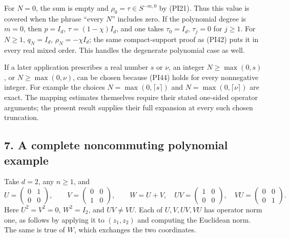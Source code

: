 \documentclass[
  11pt,
]{article}
\makeatletter
\let\ReaderOriginalAnchorStart\hyper@anchorstart
\let\ReaderOriginalAnchorEnd\hyper@anchorend
\let\ReaderPendingAliases\@empty
\def\ReaderArmAliases#1{\gdef\ReaderPendingAliases{#1}}
\def\hyper@anchorstart#1{\ReaderIfNativeAnchorTF{#1}{\ReaderPendingAliases\global\let\ReaderPendingAliases\@empty}{}\ReaderOriginalAnchorStart{#1}}
\makeatother
\begin{document}
For \(N=0\), the sum is empty and \(\rho_0=\tau\in S^{-m,0}\) by (PI21).
Thus this value is covered when the phrase ``every \(N\)'' includes
zero. If the polynomial degree is \(m=0\), then \(p=I_d\),
\(\tau=(1-\chi)I_d\), and one takes \(\tau_0=I_d\), \(\tau_j=0\) for
\(j\geq1\). For \(N\geq1\), \(q_N=I_d\), \(\rho_N=-\chi I_d\); the same
compact-support proof as (PI42) puts it in every real mixed order. This
handles the degenerate polynomial case as well.

If a later application prescribes a real number \(s\) or \(\nu\), an
integer \(N\geq\max(0,s)\), or \(N\geq\max(0,\nu)\), can be chosen
because (PI44) holds for every nonnegative integer. For example the
choices \(N=\max(0,\lceil s\rceil)\) and \(N=\max(0,\lceil\nu\rceil)\)
are exact. The mapping estimates themselves require their stated
one-sided operator arguments; the present result supplies their full
expansion at every such chosen truncation.

\ReaderArmAliases{\ReaderOriginalAnchorStart{AN03-PIN-007}\ReaderOriginalAnchorEnd\begingroup\expandafter\def\csname @currentHref\endcsname{AN03-PIN-007}\label{AN03-PIN-007}\endgroup\ReaderOriginalAnchorStart{an03-pin-007-a-complete-noncommuting-polynomial-example}\ReaderOriginalAnchorEnd\begingroup\expandafter\def\csname @currentHref\endcsname{an03-pin-007-a-complete-noncommuting-polynomial-example}\label{an03-pin-007-a-complete-noncommuting-polynomial-example}\endgroup\ReaderOriginalAnchorStart{7-a-complete-noncommuting-polynomial-example}\ReaderOriginalAnchorEnd\begingroup\expandafter\def\csname @currentHref\endcsname{7-a-complete-noncommuting-polynomial-example}\label{7-a-complete-noncommuting-polynomial-example}\endgroup}
\subsection{7. A complete noncommuting polynomial
example}\label{a-complete-noncommuting-polynomial-example}

Take \(d=2\), any \(n\geq1\), and \[
 U=\begin{pmatrix}0&1\\0&0\end{pmatrix},\qquad
 V=\begin{pmatrix}0&0\\1&0\end{pmatrix},\qquad
 W=U+V,\quad
 UV=\begin{pmatrix}1&0\\0&0\end{pmatrix},\quad
 VU=\begin{pmatrix}0&0\\0&1\end{pmatrix}.
 \tag{PI45}
\] Here \(U^2=V^2=0\), \(W^2=I_2\), and \(UV\ne VU\). Each of
\(U,V,UV,VU\) has operator norm one, as follows by applying it to
\((z_1,z_2)\) and computing the Euclidean norm. The same is true of
\(W\), which exchanges the two coordinates.
\end{document}
